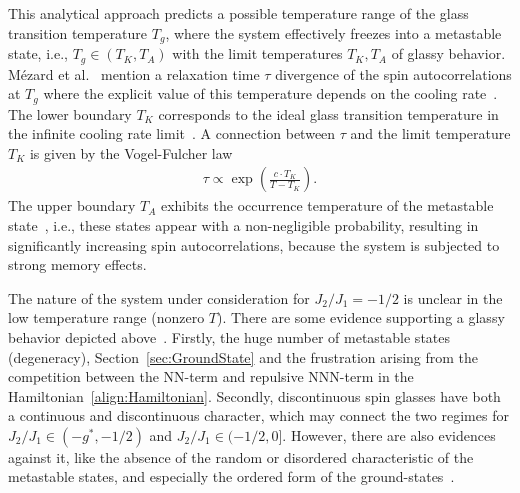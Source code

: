 This analytical approach predicts a possible temperature range of the glass transition temperature $T_g$, where the system effectively freezes into a 
metastable state, i.e., $T_g\!\in\!(T_K,T_A)$ with the limit temperatures $T_K,T_A$ of glassy behavior. M\'ezard et al.~\cite{Mezard2000} mention a relaxation 
time $\tau$ divergence of the spin autocorrelations 
at $T_g$ where the explicit value of this temperature depends on the cooling rate~\cite{Westfahl2001}. The lower boundary $T_K$ corresponds to the ideal 
glass transition temperature in the infinite cooling rate limit~\cite{Timmons2018}. A connection between $\tau$ and the limit temperature $T_K$ is
given by the Vogel-Fulcher law~\cite{Kirkpatrick1987,Westfahl2001}
\begin{align}
    \tau\propto\exp\left(\frac{c\cdot T_K}{T-T_K}\right).
    \label{align:Vogel_Fulcher}
\end{align}
The upper boundary $T_A$ exhibits the occurrence temperature of the metastable state~\cite{Kirkpatrick1987}, i.e., 
these states appear with a non-negligible probability, resulting in significantly increasing spin autocorrelations, because the system is subjected to 
strong memory effects.

The nature of the system under consideration for $J_2/J_1\!=-\!1/2$ is unclear in the low temperature range (nonzero $T$). There are some evidence supporting
a glassy behavior depicted above~\cite{Timmons2018}. Firstly, the huge number of metastable states (degeneracy), Section~\ref{sec:GroundState} and the frustration 
arising from the competition between the  NN-term and repulsive NNN-term in the Hamiltonian~\eqref{align:Hamiltonian}. Secondly, discontinuous spin glasses 
have both a continuous and discontinuous character, which may connect the two regimes for $J_2/J_1\!\in\!(-g^*,-1/2)$ and $J_2/J_1\!\in\!(-1/2,0]$.
However, there are also evidences against it, like the absence of the random or disordered characteristic of the metastable states, and 
especially the ordered form of the ground-states~\cite{Kalz2008,Lee2024}.










